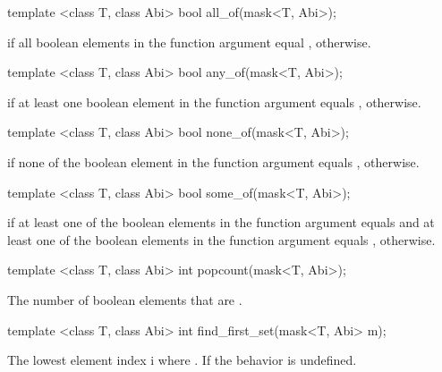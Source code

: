 \begin{itemdecl}
template <class T, class Abi> bool  all_of(mask<T, Abi>);
\end{itemdecl}
\begin{itemdescr}
  \pnum\returns \true if all boolean elements in the function argument equal \true, \false otherwise.
\end{itemdescr}

\begin{itemdecl}
template <class T, class Abi> bool  any_of(mask<T, Abi>);
\end{itemdecl}
\begin{itemdescr}
  \pnum\returns \true if at least one boolean element in the function argument equals \true, \false otherwise.
\end{itemdescr}

\begin{itemdecl}
template <class T, class Abi> bool none_of(mask<T, Abi>);
\end{itemdecl}
\begin{itemdescr}
  \pnum\returns \true if none of the boolean element in the function argument equals \true, \false otherwise.
\end{itemdescr}

\begin{itemdecl}
template <class T, class Abi> bool some_of(mask<T, Abi>);
\end{itemdecl}
\begin{itemdescr}
  \pnum\returns \true if at least one of the boolean elements in the function argument equals \true and at least one of the boolean elements in the function argument equals \false, \false otherwise.
\end{itemdescr}

\begin{itemdecl}
template <class T, class Abi> int popcount(mask<T, Abi>);
\end{itemdecl}
\begin{itemdescr}
  \pnum\returns The number of boolean elements that are \true.
\end{itemdescr}

\begin{itemdecl}
template <class T, class Abi> int find_first_set(mask<T, Abi> m);
\end{itemdecl}
\begin{itemdescr}
  \pnum\returns The lowest element index \code i where .
  \pnum\remarks If  the behavior is undefined.
\end{itemdescr}

